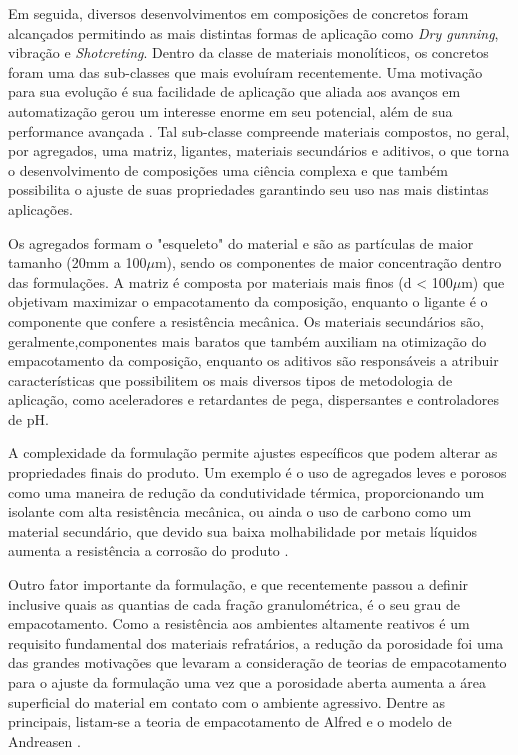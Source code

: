 Em seguida, diversos desenvolvimentos em composições de concretos foram
alcançados permitindo as mais distintas formas de aplicação como \textit{Dry
  gunning}, vibração e \textit{Shotcreting}. Dentro da classe de materiais
monolíticos, os concretos foram uma das sub-classes que mais evoluíram
recentemente. Uma motivação para sua evolução é sua facilidade de aplicação que
aliada aos avanços em automatização gerou um interesse enorme em seu potencial,
além de sua performance avançada \cite{Schacht2004}. Tal sub-classe compreende
materiais compostos, no geral, por agregados, uma matriz, ligantes, materiais
secundários e aditivos, o que torna o desenvolvimento de composições uma ciência
complexa e que também possibilita o ajuste de suas propriedades garantindo seu
uso nas mais distintas aplicações.
    
Os agregados formam o "esqueleto" do material e são as partículas de maior
tamanho (20mm a 100$\mu$m), sendo os componentes de maior
concentração dentro das formulações. A matriz é composta por materiais mais
finos (d < 100$\mu$m) que objetivam maximizar o empacotamento da composição, enquanto o ligante
é o componente que confere a resistência mecânica. Os materiais secundários são,
geralmente,componentes mais baratos que também auxiliam na otimização do
empacotamento da composição, enquanto os aditivos são responsáveis a atribuir
características que possibilitem os mais diversos tipos de metodologia de
aplicação, como aceleradores e retardantes de pega, dispersantes e controladores
de pH.
    
A complexidade da formulação permite ajustes específicos que podem alterar as
propriedades finais do produto. Um exemplo é o uso de agregados leves e porosos
como uma maneira de redução da condutividade térmica, proporcionando um isolante
com alta resistência mecânica, ou ainda o uso de carbono como um material
secundário, que devido sua baixa molhabilidade por metais líquidos aumenta a
resistência a corrosão do produto \cite{Schacht2004}.
    
Outro fator importante da formulação, e que recentemente passou a definir
inclusive quais as quantias de cada fração granulométrica, é o seu grau de
empacotamento. Como a resistência aos ambientes altamente reativos é um
requisito fundamental dos materiais refratários, a redução da porosidade foi uma
das grandes motivações que levaram a consideração de teorias de empacotamento
para o ajuste da formulação uma vez que a porosidade aberta aumenta a área
superficial do material em contato com o ambiente agressivo. Dentre as
principais, listam-se a teoria de empacotamento de Alfred e o modelo de
Andreasen \cite{Ortega1997}.
    
